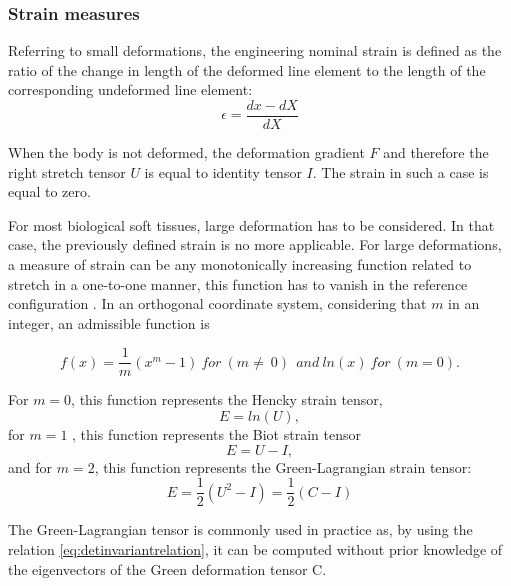 \subsubsection*{Strain measures}\label{strainmeasure}
Referring to small deformations, the engineering nominal strain is defined as the ratio of the change in length of the deformed line element to the length of the corresponding undeformed line element:  
\begin{equation}
\epsilon = \frac{ dx  - dX }{	dX }
\end{equation}

When the body is not deformed, the deformation gradient $F$ and therefore the right stretch tensor $U$ is equal to identity tensor $I$. The strain in such a case is equal to zero. 

For most biological soft tissues, large deformation has to be considered. In that case, the previously defined strain is no more applicable. For large deformations, a measure of strain can be any monotonically increasing function related to stretch in a one-to-one manner, this function has to vanish in the reference configuration \citep{mcmeeking_finite_1975}. In an orthogonal coordinate system, considering that $m$ in an integer, an admissible function is  

\begin{equation}
f(x) = \frac{1}{m}(x^m-1) \ for \ (m \ne\ 0)\  \ and \ ln(x) \ for \ (m=0).
\end{equation}


For $m = 0$, this function represents the Hencky strain tensor, 
\begin{equation}
E = ln(U), 
\end{equation}
for $m=1$ , this function represents the Biot strain tensor 
\begin{equation}
E = U-I,
\end{equation}
and for $m=2$, this function represents the Green-Lagrangian strain tensor:
\begin{equation}
E = \frac{1}{2}(U^2-I) =  \frac{1}{2}(C-I)
\end{equation}

The Green-Lagrangian tensor is commonly used in practice as, by using the relation \ref{eq:detinvariantrelation}, it can be computed without prior knowledge of the eigenvectors of the Green deformation tensor C.
%

